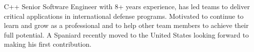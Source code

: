 

\begin{cvparagraph}

C++ Senior Software Engineer with 8+ years experience, has led teams to deliver critical applications in international defense programs. Motivated to continue to learn and grow as a professional and to help other team members to achieve their full potential. A Spaniard recently moved to the United States looking forward to making his first contribution.
\end{cvparagraph}
